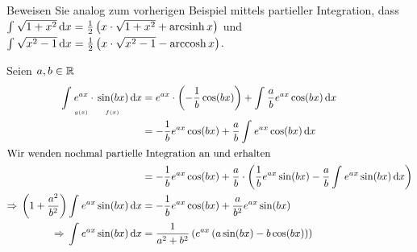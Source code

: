 \begin{uebung}
    Beweisen Sie analog zum vorherigen Beispiel mittels partieller Integration, dass $ \int_{}^{} \sqrt{1+x^2} \mathop{}\!\mathrm{d} x = \frac{1}{2}\left(x\cdot\sqrt{1+x^2} + \operatorname{arcsinh} x\right)$ und $ \int_{}^{} \sqrt{x^2-1} \mathop{}\!\mathrm{d} x = \frac{1}{2}\left(x\cdot\sqrt{x^2-1} - \operatorname{arccosh} x\right)$.
\end{uebung}

\begin{beispiel}
    Seien $a,b\in\mathbb{R}$
    \begin{align*}
        \int_{}^{} \underset{\scriptscriptstyle g\of{x}}{\vphantom{\frac{i}{i}}e^{ax}}\cdot \underset{\scriptscriptstyle f\of{x}}{\vphantom{\frac{i}{i}}\sin\of{bx}} \dif x &= e^{ax}\cdot\pair{-\frac{1}{b}\cos\of{bx}} + \int_{}^{} \frac{a}{b} e^{ax} \cos\of{bx} \dif x\\
        &= -\frac{1}{b}e^{ax} \cos\of{bx} + \frac{a}{b}\int_{}^{} e^{ax} \cos\of{bx} \dif x\\
        \intertext{Wir wenden nochmal partielle Integration an und erhalten}
        &= -\frac{1}{b}e^{ax} \cos\of{bx} + \frac{a}{b}\cdot\pair{\frac{1}{b} e^{ax} \sin\of{bx} - \frac{a}{b}\int_{}^{} e^{ax}\sin\of{bx} \dif x}\\
        \impl \pair{1+\frac{a^2}{b^2}} \int_{}^{} e^{ax}\sin\of{bx} \dif x &= -\frac{1}{b} e^{ax}\cos\of{bx} + \frac{a}{b^2}e^{ax}\sin\of{bx}\\
        \impl \int_{}^{} e^{ax}\sin\of{bx} \dif x &= \frac{1}{a^2+b^2}\pair{e^{ax}\pair{a\sin\of{bx} - b\cos\of{bx}}}
    \end{align*}
\end{beispiel}

